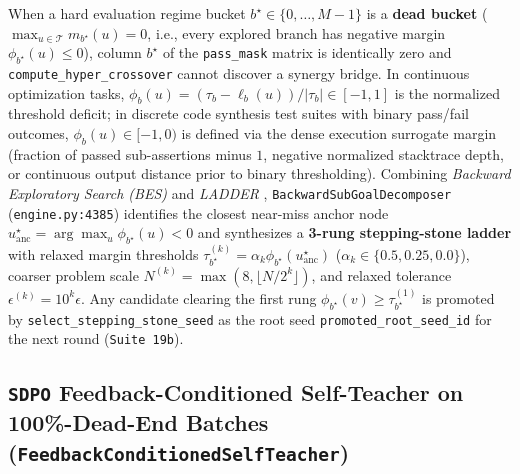 \documentclass[11pt,a4paper]{article}
\begin{document}
When a hard evaluation regime bucket $b^\star \in \{0, \dots, M-1\}$ is a \textbf{dead bucket} ($\max_{u \in \mathcal{T}} m_{b^\star}(u) = 0$, i.e., every explored branch has negative margin $\phi_{b^\star}(u) \le 0$), column $b^\star$ of the \texttt{pass\_mask} matrix is identically zero and \texttt{compute\_hyper\_crossover} cannot discover a synergy bridge. In continuous optimization tasks, $\phi_b(u) = (\tau_b - \ell_b(u))/|\tau_b| \in [-1, 1]$ is the normalized threshold deficit; in discrete code synthesis test suites with binary pass/fail outcomes, $\phi_b(u) \in [-1, 0)$ is defined via the dense execution surrogate margin (fraction of passed sub-assertions minus $1$, negative normalized stacktrace depth, or continuous output distance prior to binary thresholding). Combining \emph{Backward Exploratory Search (BES)} \cite{bes2025} and \emph{LADDER} \cite{ladder2025}, \texttt{BackwardSubGoalDecomposer} (\texttt{engine.py:4385}) identifies the closest near-miss anchor node $u_{\text{anc}}^\star = \arg\max_u \phi_{b^\star}(u) < 0$ and synthesizes a \textbf{3-rung stepping-stone ladder} with relaxed margin thresholds $\tau_{b^\star}^{(k)} = \alpha_k \phi_{b^\star}(u_{\text{anc}}^\star)$ ($\alpha_k \in \{0.5, 0.25, 0.0\}$), coarser problem scale $N^{(k)} = \max(8, \lfloor N / 2^k \rfloor)$, and relaxed tolerance $\epsilon^{(k)} = 10^k \epsilon$. Any candidate clearing the first rung $\phi_{b^\star}(v) \ge \tau_{b^\star}^{(1)}$ is promoted by \texttt{select\_stepping\_stone\_seed} as the root seed \texttt{promoted\_root\_seed\_id} for the next round (\texttt{Suite 19b}).

\subsection{\texttt{SDPO} Feedback-Conditioned Self-Teacher on 100\%-Dead-End Batches (\texttt{FeedbackConditionedSelfTeacher})}
\end{document}
